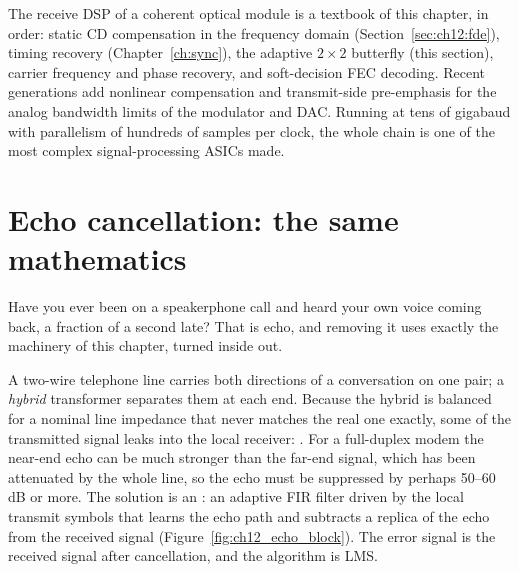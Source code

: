 \begin{inpractice}
The receive DSP of a coherent optical module is a textbook of this chapter, in order: static CD
compensation in the frequency domain (Section~\ref{sec:ch12:fde}), timing recovery
(Chapter~\ref{ch:sync}), the adaptive $2\times2$ butterfly (this section), carrier frequency and phase
recovery, and soft-decision FEC decoding. Recent generations add nonlinear compensation and
transmit-side pre-emphasis for the analog bandwidth limits of the modulator and DAC. Running at
tens of gigabaud with parallelism of hundreds of samples per clock, the whole chain is one of the most
complex signal-processing ASICs made.
\end{inpractice}

\section{Echo cancellation: the same mathematics}
\label{sec:ch12:echo}

Have you ever been on a speakerphone call and heard your own voice coming back, a fraction of a
second late? That is echo, and removing it uses exactly the machinery of this chapter, turned
inside out.

A two-wire telephone line carries both directions of a conversation on one pair; a \emph{hybrid}
transformer separates them at each end. Because the hybrid is balanced for a nominal line impedance
that never matches the real one exactly, some of the transmitted signal leaks into the local
receiver: . For a full-duplex modem the near-end echo can be much stronger than the
far-end signal, which has been attenuated by the whole line, so the echo must be suppressed by
perhaps 50--60\,dB or more. The solution is an : an adaptive FIR filter driven by
the local transmit symbols that learns the echo path and subtracts a replica of the echo from the
received signal (Figure~\ref{fig:ch12_echo_block}). The error signal is the received signal after
cancellation, and the algorithm is LMS.

